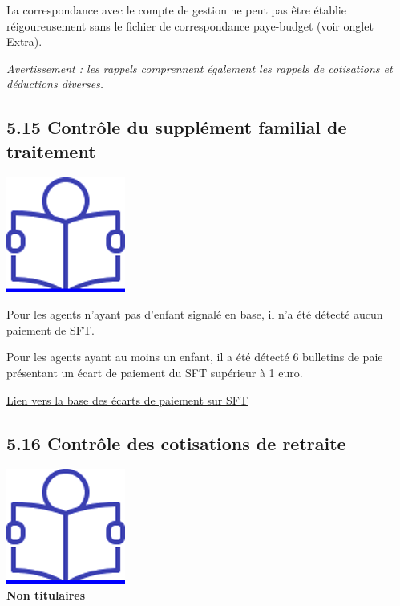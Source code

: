 La correspondance avec le compte de gestion ne peut pas être établie
réigoureusement sans le fichier de correspondance paye-budget (voir
onglet Extra).

\emph{Avertissement : les rappels comprennent également les rappels de
cotisations et déductions diverses.}

\hypertarget{controle-du-supplement-familial-de-traitement}{%
\subsection{5.15 Contrôle du supplément familial de
traitement}\label{controle-du-supplement-familial-de-traitement}}

\href{../Docs/Notices/fiche_SFT.odt}{\includegraphics{icones/Notice.png}}

Pour les agents n'ayant pas d'enfant signalé en base, il n'a été détecté
aucun paiement de SFT.

Pour les agents ayant au moins un enfant, il a été détecté 6 bulletins
de paie présentant un écart de paiement du SFT supérieur à 1 euro.

\href{../Bases/Reglementation/controle.sft.csv}{Lien vers la base des
écarts de paiement sur SFT}

\hypertarget{controle-des-cotisations-de-retraite}{%
\subsection{5.16 Contrôle des cotisations de
retraite}\label{controle-des-cotisations-de-retraite}}

\href{../Docs/Notices/fiche_retraite.odt}{\includegraphics{icones/Notice.png}}\\
\textbf{Non titulaires}

